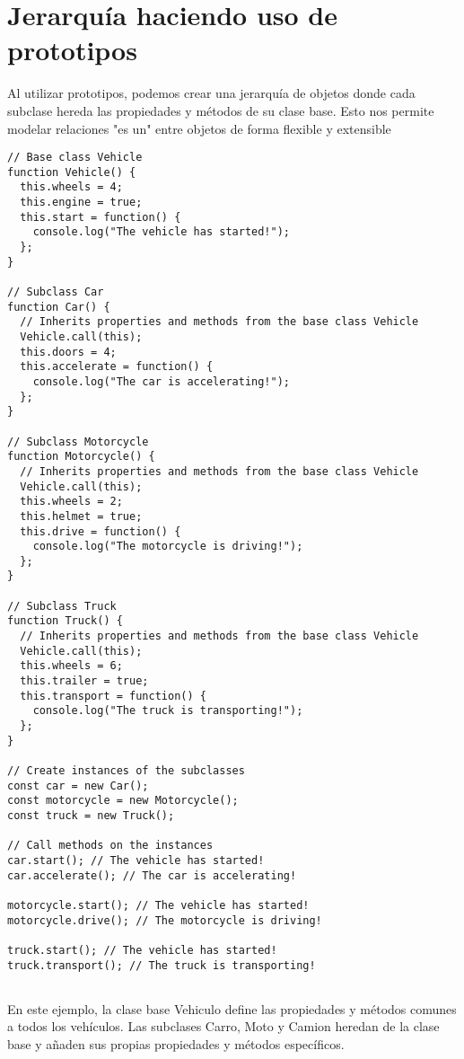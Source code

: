 \documentclass{article}
\begin{document}
\section{Jerarquía haciendo uso de prototipos}
Al utilizar prototipos, podemos crear una jerarquía de objetos donde cada subclase hereda las propiedades y métodos de su clase base. Esto nos permite modelar relaciones "es un" entre objetos de forma flexible y extensible

\begin{lstlisting}
// Base class Vehicle
function Vehicle() {
  this.wheels = 4;
  this.engine = true;
  this.start = function() {
    console.log("The vehicle has started!");
  };
}

// Subclass Car
function Car() {
  // Inherits properties and methods from the base class Vehicle
  Vehicle.call(this);
  this.doors = 4;
  this.accelerate = function() {
    console.log("The car is accelerating!");
  };
}

// Subclass Motorcycle
function Motorcycle() {
  // Inherits properties and methods from the base class Vehicle
  Vehicle.call(this);
  this.wheels = 2;
  this.helmet = true;
  this.drive = function() {
    console.log("The motorcycle is driving!");
  };
}

// Subclass Truck
function Truck() {
  // Inherits properties and methods from the base class Vehicle
  Vehicle.call(this);
  this.wheels = 6;
  this.trailer = true;
  this.transport = function() {
    console.log("The truck is transporting!");
  };
}

// Create instances of the subclasses
const car = new Car();
const motorcycle = new Motorcycle();
const truck = new Truck();

// Call methods on the instances
car.start(); // The vehicle has started!
car.accelerate(); // The car is accelerating!

motorcycle.start(); // The vehicle has started!
motorcycle.drive(); // The motorcycle is driving!

truck.start(); // The vehicle has started!
truck.transport(); // The truck is transporting!


\end{lstlisting}



En este ejemplo, la clase base Vehiculo define las propiedades y métodos comunes a todos los vehículos. Las subclases Carro, Moto y Camion heredan de la clase base y añaden sus propias propiedades y métodos específicos.
\end{document}
